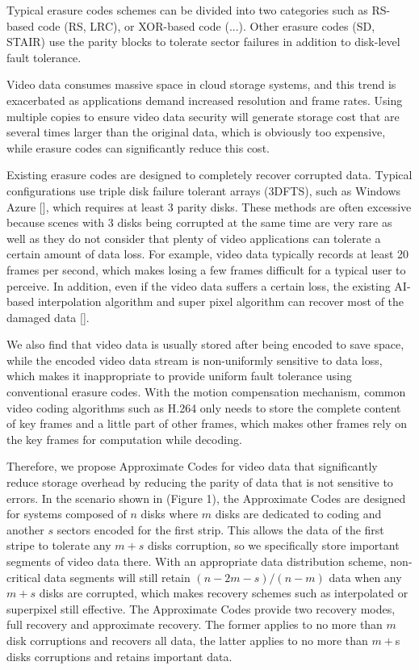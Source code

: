 \documentclass[sigconf]{acmart}
\begin{document}
Typical erasure codes schemes can be divided into two categories such as RS-based code (RS, LRC), or XOR-based code (...). Other erasure codes (SD, STAIR) use the parity blocks to tolerate sector failures in addition to disk-level fault tolerance.

Video data consumes massive space in cloud storage systems, and this trend is exacerbated as applications demand increased resolution and frame rates. Using multiple copies to ensure video data security will generate storage cost that are several times larger than the original data, which is obviously too expensive, while erasure codes can significantly reduce this cost.

Existing erasure codes are designed to completely recover corrupted data. Typical configurations use triple disk failure tolerant arrays (3DFTS), such as Windows Azure [], which requires at least 3 parity disks. These methods are often excessive because scenes with 3 disks being corrupted at the same time are very rare as well as they do not consider that plenty of video applications can tolerate a certain amount of data loss. For example, video data typically records at least 20 frames per second, which makes losing a few frames difficult for a typical user to perceive. In addition, even if the video data suffers a certain loss, the existing AI-based interpolation algorithm and super pixel algorithm can recover most of the damaged data [].

We also find that video data is usually stored after being encoded to save space, while the encoded video data stream is non-uniformly sensitive to data loss, which makes it inappropriate to provide uniform fault tolerance using conventional erasure codes. With the motion compensation mechanism, common video coding algorithms such as H.264 only needs to store the complete content of key frames and a little part of other frames, which makes other frames rely on the key frames for computation while decoding.

Therefore, we propose Approximate Codes for video data that significantly reduce storage overhead by reducing the parity of data that is not sensitive to errors. In the scenario shown in (Figure 1), the Approximate Codes are designed for systems composed of $n$ disks where $m$ disks are dedicated to coding and another $s$ sectors encoded for the first strip. This allows the data of the first stripe to tolerate any $m+s$ disks corruption, so we specifically store important segments of video data there. With an appropriate data distribution scheme, non-critical data segments will still retain $(n-2m-s)/(n-m)$ data when any $m+s$ disks are corrupted, which makes 
recovery schemes such as interpolated or superpixel still effective. The Approximate Codes provide two recovery modes, full recovery and approximate recovery. The former applies to no more than $m$ disk corruptions and recovers all data, the latter applies to no more than $m+$s disks corruptions and retains important data.
\end{document}
